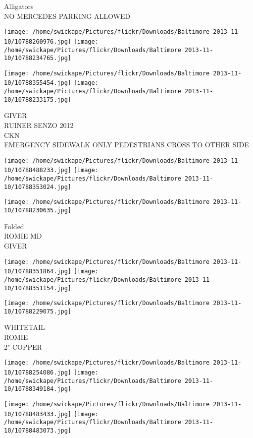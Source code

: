 \documentclass[10pt,letterpaper]{article}
\begin{document}
Alligators\\
NO MERCEDES PARKING ALLOWED
\pagebreak

\texttt{[image: /home/swickape/Pictures/flickr/Downloads/Baltimore 2013-11-10/10788260976.jpg]}
\texttt{[image: /home/swickape/Pictures/flickr/Downloads/Baltimore 2013-11-10/10788234765.jpg]}

\texttt{[image: /home/swickape/Pictures/flickr/Downloads/Baltimore 2013-11-10/10788355454.jpg]}
\texttt{[image: /home/swickape/Pictures/flickr/Downloads/Baltimore 2013-11-10/10788233175.jpg]}

GIVER\\
RUINER SENZO 2012\\
CKN\\
EMERGENCY SIDEWALK ONLY PEDESTRIANS CROSS TO OTHER SIDE
\pagebreak

\texttt{[image: /home/swickape/Pictures/flickr/Downloads/Baltimore 2013-11-10/10788488233.jpg]}
\texttt{[image: /home/swickape/Pictures/flickr/Downloads/Baltimore 2013-11-10/10788353024.jpg]}

\vspace{0.25in}
\texttt{[image: /home/swickape/Pictures/flickr/Downloads/Baltimore 2013-11-10/10788230635.jpg]}

Folded\\
ROMIE MD\\
GIVER
\pagebreak

\texttt{[image: /home/swickape/Pictures/flickr/Downloads/Baltimore 2013-11-10/10788351864.jpg]}
\texttt{[image: /home/swickape/Pictures/flickr/Downloads/Baltimore 2013-11-10/10788351154.jpg]}

\vspace{0.25in}
\texttt{[image: /home/swickape/Pictures/flickr/Downloads/Baltimore 2013-11-10/10788229075.jpg]}

WHITETAIL\\
ROMIE\\
2" COPPER
\pagebreak

\texttt{[image: /home/swickape/Pictures/flickr/Downloads/Baltimore 2013-11-10/10788254086.jpg]}
\texttt{[image: /home/swickape/Pictures/flickr/Downloads/Baltimore 2013-11-10/10788349184.jpg]}

\texttt{[image: /home/swickape/Pictures/flickr/Downloads/Baltimore 2013-11-10/10788483433.jpg]}
\texttt{[image: /home/swickape/Pictures/flickr/Downloads/Baltimore 2013-11-10/10788483073.jpg]}
\end{document}
